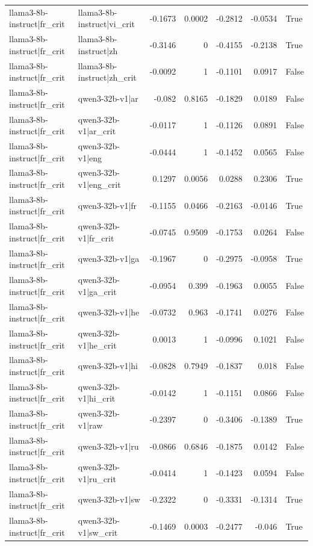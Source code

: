 \begin{table}
\begin{tabular}{l l r r r r l}
llama3-8b-instruct|fr_crit & llama3-8b-instruct|vi_crit & -0.1673 & 0.0002 & -0.2812 & -0.0534 & True \\
llama3-8b-instruct|fr_crit & llama3-8b-instruct|zh & -0.3146 & 0 & -0.4155 & -0.2138 & True \\
llama3-8b-instruct|fr_crit & llama3-8b-instruct|zh_crit & -0.0092 & 1 & -0.1101 & 0.0917 & False \\
llama3-8b-instruct|fr_crit & qwen3-32b-v1|ar & -0.082 & 0.8165 & -0.1829 & 0.0189 & False \\
llama3-8b-instruct|fr_crit & qwen3-32b-v1|ar_crit & -0.0117 & 1 & -0.1126 & 0.0891 & False \\
llama3-8b-instruct|fr_crit & qwen3-32b-v1|eng & -0.0444 & 1 & -0.1452 & 0.0565 & False \\
llama3-8b-instruct|fr_crit & qwen3-32b-v1|eng_crit & 0.1297 & 0.0056 & 0.0288 & 0.2306 & True \\
llama3-8b-instruct|fr_crit & qwen3-32b-v1|fr & -0.1155 & 0.0466 & -0.2163 & -0.0146 & True \\
llama3-8b-instruct|fr_crit & qwen3-32b-v1|fr_crit & -0.0745 & 0.9509 & -0.1753 & 0.0264 & False \\
llama3-8b-instruct|fr_crit & qwen3-32b-v1|ga & -0.1967 & 0 & -0.2975 & -0.0958 & True \\
llama3-8b-instruct|fr_crit & qwen3-32b-v1|ga_crit & -0.0954 & 0.399 & -0.1963 & 0.0055 & False \\
llama3-8b-instruct|fr_crit & qwen3-32b-v1|he & -0.0732 & 0.963 & -0.1741 & 0.0276 & False \\
llama3-8b-instruct|fr_crit & qwen3-32b-v1|he_crit & 0.0013 & 1 & -0.0996 & 0.1021 & False \\
llama3-8b-instruct|fr_crit & qwen3-32b-v1|hi & -0.0828 & 0.7949 & -0.1837 & 0.018 & False \\
llama3-8b-instruct|fr_crit & qwen3-32b-v1|hi_crit & -0.0142 & 1 & -0.1151 & 0.0866 & False \\
llama3-8b-instruct|fr_crit & qwen3-32b-v1|raw & -0.2397 & 0 & -0.3406 & -0.1389 & True \\
llama3-8b-instruct|fr_crit & qwen3-32b-v1|ru & -0.0866 & 0.6846 & -0.1875 & 0.0142 & False \\
llama3-8b-instruct|fr_crit & qwen3-32b-v1|ru_crit & -0.0414 & 1 & -0.1423 & 0.0594 & False \\
llama3-8b-instruct|fr_crit & qwen3-32b-v1|sw & -0.2322 & 0 & -0.3331 & -0.1314 & True \\
llama3-8b-instruct|fr_crit & qwen3-32b-v1|sw_crit & -0.1469 & 0.0003 & -0.2477 & -0.046 & True \\

\end{tabular}
\end{table}
